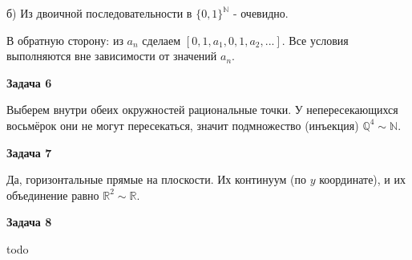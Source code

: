 б) Из двоичной последовательности в $\displaystyle \{0,1\}^{\mathbb{N}}$ - очевидно.

В обратную сторону: из $\displaystyle a_{n}$ сделаем $\displaystyle [ 0,1,a_{1} ,0,1,a_{2} ,...]$. Все условия выполняются вне зависимости от значений $\displaystyle a_{n}$.

\begin{center}
\textbf{Задача 6}
\end{center}
Выберем внутри обеих окружностей рациональные точки. У непересекающихся восьмёрок они не могут пересекаться, значит подмножество (инъекция) $\displaystyle \mathbb{Q}^{4} \sim \mathbb{N}$.

\begin{center}
\textbf{Задача 7}
\end{center}
Да, горизонтальные прямые на плоскости. Их континуум (по $\displaystyle y$ координате), и их объединение равно $\displaystyle \mathbb{R}^{2} \sim \mathbb{R}$.

\begin{center}
\textbf{Задача 8}
\end{center}
todo